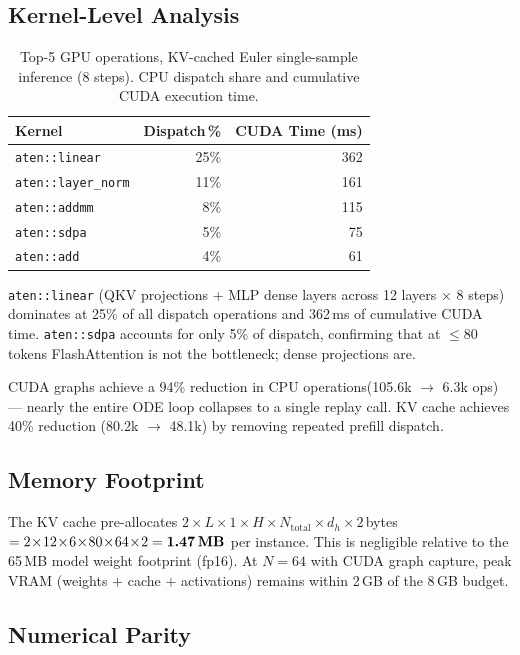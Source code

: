 \documentclass[letterpaper,twocolumn,10pt]{article}
\begin{document}
\subsection{Kernel-Level Analysis}

\begin{table}[H]
\centering
\caption{Top-5 GPU operations, KV-cached Euler single-sample
  inference (8 steps).  CPU dispatch share and cumulative CUDA
  execution time.}
\label{tab:kernels}
\begin{tabular}{@{}lrr@{}}
\toprule
\textbf{Kernel} & \textbf{Dispatch\,\%} & \textbf{CUDA Time (ms)} \\
\midrule
\texttt{aten::linear}      & 25\% & 362 \\
\texttt{aten::layer\_norm} & 11\% & 161 \\
\texttt{aten::addmm}       & 8\%  & 115 \\
\texttt{aten::sdpa}        & 5\%  &  75 \\
\texttt{aten::add}         & 4\%  &  61 \\
\bottomrule
\end{tabular}
\end{table}

\texttt{aten::linear} (QKV projections + MLP dense layers across 12
layers $\times$ 8 steps) dominates at 25\% of all dispatch operations
and 362\,ms of cumulative CUDA time.  \texttt{aten::sdpa} accounts
for only 5\% of dispatch, confirming that at ${\le}80$ tokens
FlashAttention is not the bottleneck; dense projections are.

CUDA graphs achieve a 94\% reduction in CPU operations(105.6k
$\to$ 6.3k ops) --- nearly the entire ODE loop collapses to a single
replay call.  KV cache achieves 40\% reduction (80.2k $\to$ 48.1k)
by removing repeated prefill dispatch.


\subsection{Memory Footprint}

The KV cache pre-allocates
$2 \!\times\! L \!\times\! 1 \!\times\! H \!\times\! N_\text{total}
\!\times\! d_h \!\times\! 2$\,bytes
$= 2 \!\times\! 12 \!\times\! 6 \!\times\! 80 \!\times\! 64
\!\times\! 2 = \textbf{1.47\,MB}$ per instance.
This is negligible relative to the 65\,MB model weight footprint
(fp16).  At $N{=}64$ with CUDA graph capture, peak VRAM (weights $+$
cache $+$ activations) remains within 2\,GB of the 8\,GB budget.

\subsection{Numerical Parity}
\end{document}
